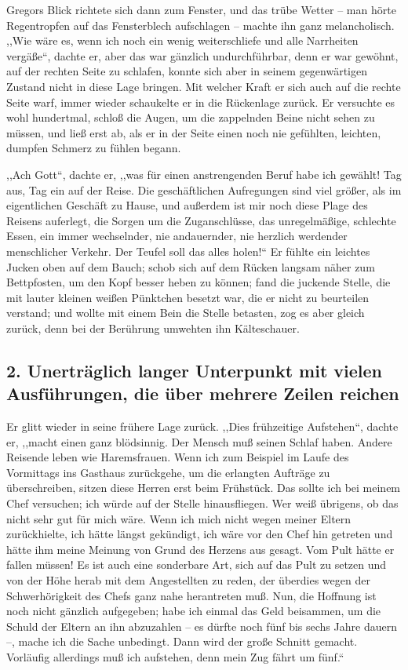 Gregors Blick richtete sich dann zum Fenster, und das trübe Wetter -- man hörte Regentropfen auf das Fensterblech aufschlagen -- machte ihn ganz melancholisch. ,,Wie wäre es, wenn ich noch ein wenig weiterschliefe und alle Narrheiten vergäße``, dachte er, aber das war gänzlich undurchführbar, denn er war gewöhnt, auf der rechten Seite zu schlafen, konnte sich aber in seinem gegenwärtigen Zustand nicht in diese Lage bringen. Mit welcher Kraft er sich auch auf die rechte Seite warf, immer wieder schaukelte er in die Rückenlage zurück. Er versuchte es wohl hundertmal, schloß die Augen, um die zappelnden Beine nicht sehen zu müssen, und ließ erst ab, als er in der Seite einen noch nie gefühlten, leichten, dumpfen Schmerz zu fühlen begann.

,,Ach Gott``, dachte er, ,,was für einen anstrengenden Beruf habe ich gewählt! Tag aus, Tag ein auf der Reise. Die geschäftlichen Aufregungen sind viel größer, als im eigentlichen Geschäft zu Hause, und außerdem ist mir noch diese Plage des Reisens auferlegt, die Sorgen um die Zuganschlüsse, das unregelmäßige, schlechte Essen, ein immer wechselnder, nie andauernder, nie herzlich werdender menschlicher Verkehr. Der Teufel soll das alles holen!{}`` Er fühlte ein leichtes Jucken oben auf dem Bauch; schob sich auf dem Rücken langsam näher zum Bettpfosten, um den Kopf besser heben zu können; fand die juckende Stelle, die mit lauter kleinen weißen Pünktchen besetzt war, die er nicht zu beurteilen verstand; und wollte mit einem Bein die Stelle betasten, zog es aber gleich zurück, denn bei der Berührung umwehten ihn Kälteschauer.

\subsection{2. Unerträglich langer Unterpunkt mit vielen Ausführungen, die über mehrere Zeilen reichen}

Er glitt wieder in seine frühere Lage zurück. ,,Dies frühzeitige Aufstehen``, dachte er, ,,macht einen ganz blödsinnig. Der Mensch muß seinen Schlaf haben. Andere Reisende leben wie Haremsfrauen. Wenn ich zum Beispiel im Laufe des Vormittags ins Gasthaus zurückgehe, um die erlangten Aufträge zu überschreiben, sitzen diese Herren erst beim Frühstück. Das sollte ich bei meinem Chef versuchen; ich würde auf der Stelle hinausfliegen. Wer weiß übrigens, ob das nicht sehr gut für mich wäre. Wenn ich mich nicht wegen meiner Eltern zurückhielte, ich hätte längst gekündigt, ich wäre vor den Chef hin getreten und hätte ihm meine Meinung von Grund des Herzens aus gesagt. Vom Pult hätte er fallen müssen! Es ist auch eine sonderbare Art, sich auf das Pult zu setzen und von der Höhe herab mit dem Angestellten zu reden, der überdies wegen der Schwerhörigkeit des Chefs ganz nahe herantreten muß. Nun, die Hoffnung ist noch nicht gänzlich aufgegeben; habe ich einmal das Geld beisammen, um die Schuld der Eltern an ihn abzuzahlen -- es dürfte noch fünf bis sechs Jahre dauern --, mache ich die Sache unbedingt. Dann wird der große Schnitt gemacht. Vorläufig allerdings muß ich aufstehen, denn mein Zug fährt um fünf.``

